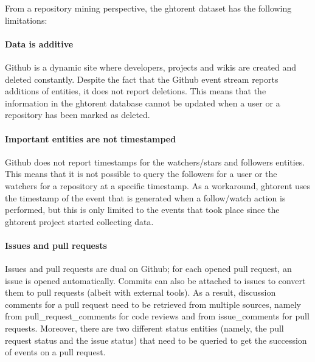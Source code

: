 \documentclass[conference]{IEEEtran}
\begin{document}
From a repository mining perspective, the {\sc ght}orent dataset has the following
limitations: 

\paragraph*{Data is additive} Github is a dynamic site where developers, 
    projects and wikis are created and deleted constantly. Despite the fact
    that the Github event stream reports additions of entities, it does
    not report deletions. This means that the information in the {\sc ght}orent 
    database cannot be updated when a user or a repository has been marked
    as deleted.

\paragraph*{Important entities are not timestamped}
\label{chal:timestamp}
Github does not report
    timestamps for the watchers/stars and followers entities. This means that it
    is not possible to query the followers for a user or the watchers for a
    repository at a specific timestamp. As a workaround, {\sc ght}orent uses the
    timestamp of the event that is generated when a follow/watch action is
    performed, but this is only limited to the events that took place since
    the {\sc ght}orent project started collecting data.


\paragraph*{Issues and pull requests} Issues and pull requests are dual on
Github; for each opened pull request, an issue is opened automatically.  Commits
can also be attached to issues to convert them to pull requests (albeit with
external tools). As a result, discussion comments for a pull request need to be
retrieved from multiple sources, namely from {\sf pull\_request\_comments} for
code reviews and from {\sf issue\_comments} for pull requests. Moreover, there
are two different status entities (namely, the pull request status and the issue
status) that need to be queried to get the succession of events on a pull
request.
\end{document}
